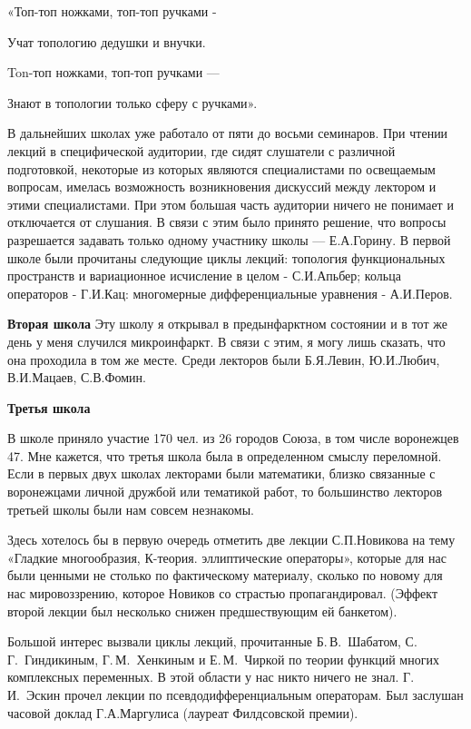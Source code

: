 «Топ-топ ножками, топ-топ ручками -

Учат топологию дедушки и внучки.

Ton-топ ножками, топ-топ ручками —

Знают в топологии только сферу с ручками».

В дальнейших школах уже работало от пяти до восьми семинаров. При чтении лекций в специфической аудитории, где сидят слушатели с различной подготовкой, некоторые из которых являются специалистами по освещаемым вопросам, имелась возможность возникновения дискуссий между лектором и этими специалистами. При этом большая часть аудитории ничего не понимает и отключается от слушания. В связи с этим было принято решение, что вопросы разрешается задавать только одному участнику школы — Е.А.Горину.
В первой школе были прочитаны следующие циклы лекций: топология функциональных пространств и вариационное исчисление в целом - С.И.Апьбер; кольца операторов - Г.И.Кац: многомерные дифференциальные уравнения - А.И.Перов.

{\bf Вторая школа}
Эту школу я открывал в предынфарктном состоянии и в тот же день у меня случился микроинфаркт.
В связи с этим, я могу лишь сказать, что она проходила в том же месте. Среди лекторов были Б.Я.Левин, Ю.И.Любич, В.И.Мацаев, С.В.Фомин.

{\bf Третья школа}

В школе приняло участие 170 чел. из 26 городов Союза, в том числе воронежцев 47. Мне кажется, что третья школа была в определенном смыслу переломной. Если в первых двух школах лекторами были математики, близко связанные с воронежцами личной дружбой или тематикой работ, то большинство лекторов третьей школы были нам совсем незнакомы.

Здесь хотелось бы в первую очередь отметить две лекции С.П.Новикова на тему «Гладкие многообразия, К-теория. эллиптические операторы», которые для нас были ценными не столько по фактическому материалу, сколько по новому для нас мировоззрению, которое Новиков со страстью пропагандировал. (Эффект второй лекции был несколько снижен предшествующим ей банкетом).

Большой интерес вызвали циклы лекций,
прочитанные Б.\,В.~Шабатом, С.\,Г.~Гиндикиным,
Г.\,М.~Хенкиным и
\linebreak
Е.\,М.~Чиркой по теории функций многих комплексных переменных.
В этой области у нас никто ничего не знал.
Г.\,И.~Эскин прочел лекции по псевдодифференциальным операторам. Был заслушан часовой доклад Г.А.Маргулиса (лауреат Филдсовской премии).

